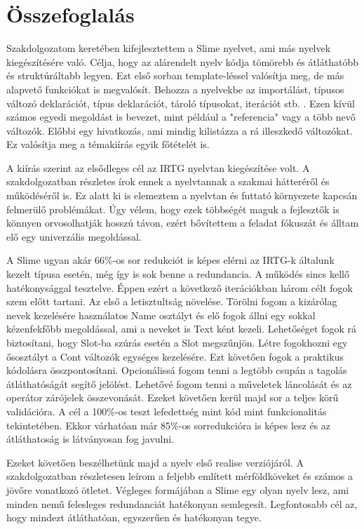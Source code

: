 \chapter{Összefoglalás}
\label{sec:conclusion}


Szakdolgozatom keretében kifejlesztettem a Slime nyelvet, ami más nyelvek kiegészítésére való.
Célja, hogy az alárendelt nyelv kódja tömörebb és átláthatóbb és struktúráltabb legyen.
Ezt első sorban template-léssel valósítja meg, de más alapvető funkciókat is megvalósít.
Behozza a nyelvekbe az importálást, típusos változó deklarációt, típus deklarációt, tároló típusokat, iterációt stb. .
Ezen kívül számos egyedi megoldást is bevezet, mint például a "referencia" vagy a több nevő változók.
Előbbi egy hivatkozás, ami mindig kilistázza a rá illeszkedő változókat.
Ez valósítja meg a témakiírás egyik főtételét is.

A kiírás szerint az elsődleges cél az IRTG nyelvtan kiegészítése volt.
A szakdolgozatban részletes írok ennek a nyelvtannak a szakmai hátteréről és működéséről is.
Ez alatt ki is elemeztem a nyelvtan és futtató környezete kapcsán felmerülő problémákat.
Úgy vélem, hogy ezek többségét maguk a fejlesztők is könnyen orvosolhatják hosszú távon, 
ezért bővítettem a feladat fókuszát és álltam elő egy univerzális megoldással.

A Slime ugyan akár 66\%-os sor redukciót is képes elérni az IRTG-k általunk kezelt típusa esetén, még így is sok benne a redundancia.
A működés sincs kellő hatékonysággal tesztelve.
Éppen ezért a következő iterációkban három célt fogok szem előtt tartani.
Az első a letisztultság növelése.
Törölni fogom a kizárólag nevek kezelésére használatos Name osztályt és elő fogok állni egy sokkal kézenfekfőbb megoldással, ami a neveket is Text ként kezeli.
Lehetőséget fogok rá biztosítani, hogy Slot-ba szúrás esetén a Slot megszűnjön.
Létre fogokhozni egy ősosztályt a Cont változók egységes kezelésére.
Ezt követően fogok a praktikus kódolásra összpontosítani.
Opcionálissá fogom tenni a legtöbb csupán a tagolás átláthatóságát segítő jelölést.
Lehetővé fogom tenni a műveletek láncolását és az operátor zárójelek összevonását.
Ezeket követően kerül majd sor a teljes körű validációra.
A cél a 100\%-os teszt lefedettség mint kód mint funkcionalitás tekintetében.
Ekkor várhatóan már 85\%-os sorredukcióra is képes lesz és az átláthatoság is látványosan fog javulni.

Ezeket követően beszélhetünk majd a nyelv első realise verziójáról.
A szakdolgozatban részletesen leírom a feljebb említett mérföldköveket és számos a jövőre vonatkozó ötletet.
Végleges formájában a Slime egy olyan nyelv lesz, ami minden nemű felesleges redundanciát hatékonyan semlegesít.
Legfontosabb cél az, hogy mindezt átláthatóan, egyszerűen és hatékonyan tegye.